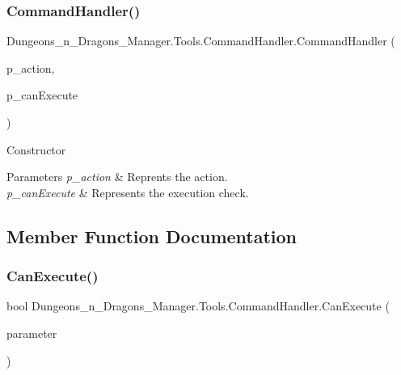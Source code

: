 \subsubsection{\texorpdfstring{Command\+Handler()}{CommandHandler()}}
{\footnotesize\ttfamily Dungeons\+\_\+n\+\_\+\+Dragons\+\_\+\+Manager.\+Tools.\+Command\+Handler.\+Command\+Handler (\begin{DoxyParamCaption}\item[{Action}]{p\+\_\+action,  }\item[{bool}]{p\+\_\+can\+Execute }\end{DoxyParamCaption})\hspace{0.3cm}{\ttfamily [inline]}}



Constructor 


\begin{DoxyParams}{Parameters}
{\em p\+\_\+action} & Reprents the action.\\
\hline
{\em p\+\_\+can\+Execute} & Represents the execution check.\\
\hline
\end{DoxyParams}


\subsection{Member Function Documentation}
\mbox{\label{class_dungeons__n___dragons___manager_1_1_tools_1_1_command_handler_a6ba70de2094840d5e54f317df754ead4}} 
\subsubsection{\texorpdfstring{Can\+Execute()}{CanExecute()}}
{\footnotesize\ttfamily bool Dungeons\+\_\+n\+\_\+\+Dragons\+\_\+\+Manager.\+Tools.\+Command\+Handler.\+Can\+Execute (\begin{DoxyParamCaption}\item[{object}]{parameter }\end{DoxyParamCaption})\hspace{0.3cm}{\ttfamily [inline]}}



